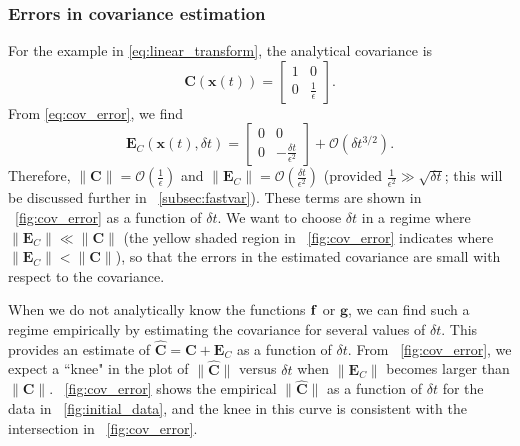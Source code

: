 \subsubsection{Errors in covariance estimation}

For the example in \eqref{eq:linear_transform}, the analytical covariance is
 \begin{equation} \label{eq:cov_linear_example}
\mathbf{C}(\mathbf{x}(t)) =
\begin{bmatrix}
1 & 0 \\
0 & \frac{1}{\epsilon}
\end{bmatrix}.
\end{equation}
%
From \eqref{eq:cov_error}, we find
%
\begin{equation}
\mathbf{E}_C(\mathbf{x}(t), \delta t) =
\begin{bmatrix}
0 & 0 \\
0 & -\frac{\delta t}{\epsilon^2}
\end{bmatrix}
+ \mathcal{O} (\delta t^{3/2}) .
\end{equation}
%
Therefore, $\| \mathbf{C} \| = \mathcal{O} \left( \frac{1}{\epsilon} \right)$ and $\|\mathbf{E}_C \| = \mathcal{O}\left(\frac{\delta t}{\epsilon^2} \right)$ (provided $\frac{1}{\epsilon^2} \gg \sqrt{\delta t}$; this will be discussed further in \sec~\ref{subsec:fastvar}).
%
These terms are shown in \fig~\ref{fig:cov_error} as a function of $\delta t$.
%
We want to choose $\delta t$ in a regime where $\| \mathbf{E}_C \| \ll \| \mathbf{C} \|$ (the yellow shaded region in \fig~\ref{fig:cov_error} indicates where $\| \mathbf{E}_C \| < \| \mathbf{C} \|$), so that the errors in the estimated covariance are small with respect to the covariance.

When we do not analytically know the functions $\mathbf{f}$ or $\mathbf{g}$, we can find such a regime empirically by
estimating the covariance for several values of $\delta t$.
%
This provides an estimate of $\widehat{\mathbf{C}} = \mathbf{C} + \mathbf{E}_C$ as a function of $\delta t$.
%
From \fig~\ref{fig:cov_error}, we expect a ``knee" in the plot of $\| \widehat{\mathbf{C}} \|$ versus $\delta t$ when $\| \mathbf{E}_C \|$ becomes larger than $\| \mathbf{C}\|$.
%
\fig~\ref{fig:cov_error} shows the empirical $\| \widehat{\mathbf{C}} \|$ as a function of $\delta t$ for the data in \fig~\ref{fig:initial_data}, and the knee in this curve is consistent with the intersection in \fig~\ref{fig:cov_error}.

